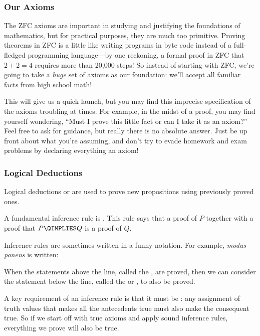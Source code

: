 \subsubsection{Our Axioms}

The ZFC axioms are important in studying and justifying the foundations of
mathematics, but for practical purposes, they are much too primitive.
Proving theorems in ZFC is a little like writing programs in byte code
instead of a full-fledged programming language---by one reckoning, a
formal proof in ZFC that $2 + 2 = 4$ requires more than 20,000 steps!  So
instead of starting with ZFC, we're going to take a \textit{huge} set of
axioms as our foundation: we'll accept all familiar facts from high school
math!

This will give us a quick launch, but you may find this imprecise
specification of the axioms troubling at times.  For example, in the midst
of a proof, you may find yourself wondering, ``Must I prove this little
fact or can I take it as an axiom?''  Feel free to ask for guidance, but
really there is no absolute answer.  Just be up front about what you're
assuming, and don't try to evade homework and exam problems by declaring
everything an axiom!

\subsubsection{Logical Deductions}

Logical deductions or  are used to prove new
propositions using previously proved ones.

A fundamental inference rule is .  This rule says that
a proof of $P$ together with a proof that $P \QIMPLIES Q$ is a proof of
$Q$.

Inference rules are sometimes written in a funny notation.  For example,
\emph{modus ponens} is written:
\begin{rul*}
\end{rul*}

When the statements above the line, called the , are
proved, then we can consider the statement below the line, called the
 or , to also be proved.

A key requirement of an inference rule is that it must be : any
assignment of truth values that makes all the antecedents true must also
make the consequent true.  So if we start off with true axioms and apply
sound inference rules, everything we prove will also be true.


